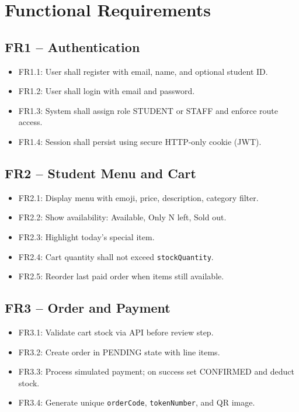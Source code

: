 \section{Functional Requirements}

\subsection{FR1 -- Authentication}
\begin{itemize}
  \item FR1.1: User shall register with email, name, and optional student ID.
  \item FR1.2: User shall login with email and password.
  \item FR1.3: System shall assign role STUDENT or STAFF and enforce route access.
  \item FR1.4: Session shall persist using secure HTTP-only cookie (JWT).
\end{itemize}

\subsection{FR2 -- Student Menu and Cart}
\begin{itemize}
  \item FR2.1: Display menu with emoji, price, description, category filter.
  \item FR2.2: Show availability: Available, Only N left, Sold out.
  \item FR2.3: Highlight today's special item.
  \item FR2.4: Cart quantity shall not exceed \texttt{stockQuantity}.
  \item FR2.5: Reorder last paid order when items still available.
\end{itemize}

\subsection{FR3 -- Order and Payment}
\begin{itemize}
  \item FR3.1: Validate cart stock via API before review step.
  \item FR3.2: Create order in PENDING state with line items.
  \item FR3.3: Process simulated payment; on success set CONFIRMED and deduct stock.
  \item FR3.4: Generate unique \texttt{orderCode}, \texttt{tokenNumber}, and QR image.
\end{itemize}


